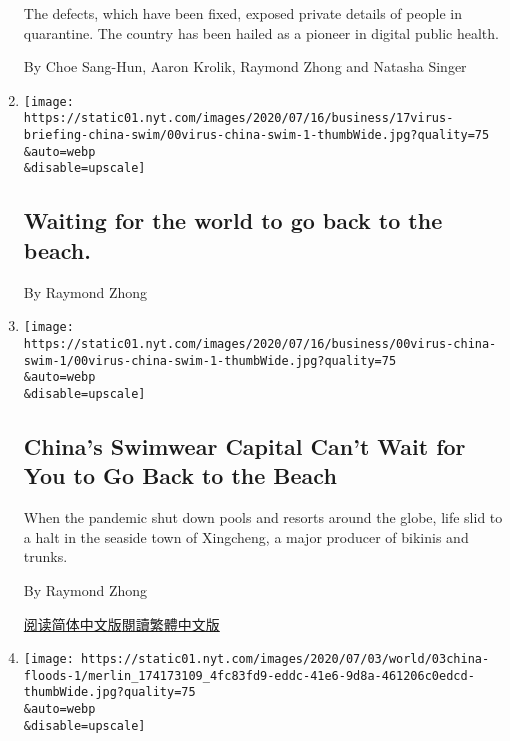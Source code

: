 \begin{enumerate}
  The defects, which have been fixed, exposed private details of people
  in quarantine. The country has been hailed as a pioneer in digital
  public health.

  By Choe Sang-Hun, Aaron Krolik, Raymond Zhong and Natasha Singer
\item
  \href{/live/2020/07/17/business/stock-market-today-coronavirus/waiting-for-the-world-to-go-back-to-the-beach}{}

  \texttt{[image: https://static01.nyt.com/images/2020/07/16/business/17virus-briefing-china-swim/00virus-china-swim-1-thumbWide.jpg?quality=75\\\&auto=webp\\\&disable=upscale]}

  \hypertarget{waiting-for-the-world-to-go-back-to-the-beach}{%
  \subsection{Waiting for the world to go back to the
  beach.}\label{waiting-for-the-world-to-go-back-to-the-beach}}

  By Raymond Zhong
\item
  \href{/2020/07/17/business/china-coronavirus-swimsuits.html}{}

  \texttt{[image: https://static01.nyt.com/images/2020/07/16/business/00virus-china-swim-1/00virus-china-swim-1-thumbWide.jpg?quality=75\\\&auto=webp\\\&disable=upscale]}

  \hypertarget{chinas-swimwear-capital-cant-wait-for-you-to-go-back-to-the-beach}{%
  \subsection{China's Swimwear Capital Can't Wait for You to Go Back to
  the
  Beach}\label{chinas-swimwear-capital-cant-wait-for-you-to-go-back-to-the-beach}}

  When the pandemic shut down pools and resorts around the globe, life
  slid to a halt in the seaside town of Xingcheng, a major producer of
  bikinis and trunks.

  By Raymond Zhong

  \href{https://cn.nytimes.com/business/20200720/china-coronavirus-swimsuits/}{阅读简体中文版}\href{https://cn.nytimes.com/business/20200720/china-coronavirus-swimsuits/zh-hant/}{閱讀繁體中文版}
\item
  \href{/2020/07/03/world/asia/china-floods-rain.html}{}

  \texttt{[image: https://static01.nyt.com/images/2020/07/03/world/03china-floods-1/merlin\_174173109\_4fc83fd9-eddc-41e6-9d8a-461206c0edcd-thumbWide.jpg?quality=75\\\&auto=webp\\\&disable=upscale]}


\end{enumerate}
